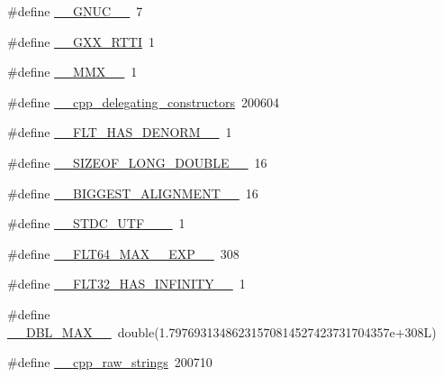 \begin{DoxyCompactItemize}
\item 
\#define \hyperlink{cmake-build-debug_2babel__client__autogen_2moc__predefs_8h_aa51016843ec55a0a9df7ce9f85767ee7}{\+\_\+\+\_\+\+G\+N\+U\+C\+\_\+\+\_\+}~7
\item 
\#define \hyperlink{cmake-build-debug_2babel__client__autogen_2moc__predefs_8h_af607715c8c9a98aa72c81c6629554b0d}{\+\_\+\+\_\+\+G\+X\+X\+\_\+\+R\+T\+TI}~1
\item 
\#define \hyperlink{cmake-build-debug_2babel__client__autogen_2moc__predefs_8h_ab61dd6e368adb90e2eff5739188b0bcb}{\+\_\+\+\_\+\+M\+M\+X\+\_\+\+\_\+}~1
\item 
\#define \hyperlink{cmake-build-debug_2babel__client__autogen_2moc__predefs_8h_a9e077def8c310cdb5fef37666a92c5a5}{\+\_\+\+\_\+cpp\+\_\+delegating\+\_\+constructors}~200604
\item 
\#define \hyperlink{cmake-build-debug_2babel__client__autogen_2moc__predefs_8h_a82a2c3ff271d1685b450975ffa68544a}{\+\_\+\+\_\+\+F\+L\+T\+\_\+\+H\+A\+S\+\_\+\+D\+E\+N\+O\+R\+M\+\_\+\+\_\+}~1
\item 
\#define \hyperlink{cmake-build-debug_2babel__client__autogen_2moc__predefs_8h_aae92712264b830cd7d24d4b81d502ffb}{\+\_\+\+\_\+\+S\+I\+Z\+E\+O\+F\+\_\+\+L\+O\+N\+G\+\_\+\+D\+O\+U\+B\+L\+E\+\_\+\+\_\+}~16
\item 
\#define \hyperlink{cmake-build-debug_2babel__client__autogen_2moc__predefs_8h_a2c25ec0f0ae74f9d8a7c373288a28dd1}{\+\_\+\+\_\+\+B\+I\+G\+G\+E\+S\+T\+\_\+\+A\+L\+I\+G\+N\+M\+E\+N\+T\+\_\+\+\_\+}~16
\item 
\#define \hyperlink{cmake-build-debug_2babel__client__autogen_2moc__predefs_8h_a93a5a9d251e5bff3c2a130627f20e782}{\+\_\+\+\_\+\+S\+T\+D\+C\+\_\+\+U\+T\+F\+\_\+\_\+\+\_\+}~1
\item 
\#define \hyperlink{cmake-build-debug_2babel__client__autogen_2moc__predefs_8h_aeb14f5cf7cca3a01c2f6a0015e981eb1}{\+\_\+\+\_\+\+F\+L\+T64\+\_\+\+M\+A\+X\+\_\+\_\+\+E\+X\+P\+\_\+\+\_\+}~308
\item 
\#define \hyperlink{cmake-build-debug_2babel__client__autogen_2moc__predefs_8h_a170219070ed7bdfea9f88121c9abbaea}{\+\_\+\+\_\+\+F\+L\+T32\+\_\+\+H\+A\+S\+\_\+\+I\+N\+F\+I\+N\+I\+T\+Y\+\_\+\+\_\+}~1
\item 
\#define \hyperlink{cmake-build-debug_2babel__client__autogen_2moc__predefs_8h_a711d7b7f27671b10b11a74c37f653ad7}{\+\_\+\+\_\+\+D\+B\+L\+\_\+\+M\+A\+X\+\_\+\+\_\+}~double(1.\+79769313486231570814527423731704357e+308\+L)
\item 
\#define \hyperlink{cmake-build-debug_2babel__client__autogen_2moc__predefs_8h_a7377e1bc6bd2fd9bcfe98283ab0e9037}{\+\_\+\+\_\+cpp\+\_\+raw\+\_\+strings}~200710

\end{DoxyCompactItemize}
